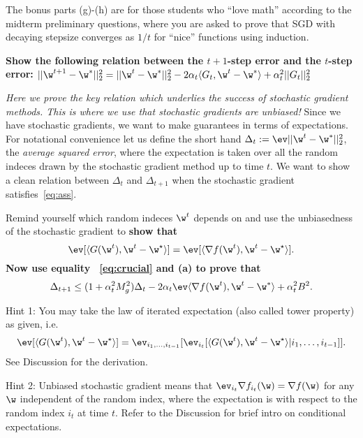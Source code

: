 \documentclass[preview]{standalone}
\begin{document}
The bonus parts (g)-(h) are for those students who ``love math''
according to the midterm preliminary questions, where you are
asked to prove that SGD with decaying stepsize converges as $1/t$
for ``nice'' functions using induction.

\begin{Parts}

\Part \textbf{Show the following relation between the $t+1$-step error and the $t$-step error: $||\w^{t+1} - \w^* ||_2^2 = ||\w^{t} - \w^*||_2^2 - 2\alpha_t \langle G_t, \w^t - \w^* \rangle + \alpha_t^2 ||G_t||_2^2$}



\Part \emph{Here we prove the key relation which underlies the success of stochastic gradient methods. This is where we use that stochastic gradients are unbiased!} Since we have stochastic gradients, we want to make guarantees in terms of expectations. For notational convenience let us define the short hand $\Delta_t := \ev ||\w^t-\w^*||_2^2$, the \emph{average squared error}, where the expectation is taken over all the random indeces drawn by the stochastic gradient method up to time $t$. We want to show a clean relation between $\Delta_t$ and $\Delta_{t+1}$ when the stochastic gradient satisfies~\eqref{eq:ass}. 

Remind yourself which random indeces $\w^t$ depends on and use the
unbiasedness of the stochastic gradient to {\bf show that}
\begin{equation}
\label{eq:crucial}
\ev [ \langle G(\updt{t}), \updt{t} - \best\rangle] = \ev [ \langle \nabla f(\updt{t}),\updt{t}-\best\rangle  ].
\end{equation}
\textbf{Now use equality ~\eqref{eq:crucial} and (a) to prove that}
\begin{equation}
\label{eq:useful}
\Delta_{t+1} \leq (1+\alpha_t^2 M_g^2)\Delta_t - 2\alpha_t \ev \langle \nabla f(\w^t), \w^t - \w^* \rangle + \alpha_t^2 B^2.
\end{equation}

Hint 1: You may take the law of iterated expectation (also called tower property) as given, i.e.
\begin{equation*}
\ev [ \langle G(\updt{t}), \updt{t} - \best\rangle] = \ev_{i_1,\dots,i_{t-1}}[ \ev_{i_t}
[ \langle G(\updt{t}), \updt{t} - \best\rangle | i_1, \dots, i_{t-1}
]].
\end{equation*}
See Discussion for the derivation.

Hint 2: Unbiased stochastic gradient means that $\ev_{i_t} \nabla f_{i_t}(\w) = \nabla f(\w)$ for any $\w$ independent of the random index, where the expectation is with respect to the random index $i_t$ at time $t$. Refer to the Discussion for brief intro on conditional expectations.



\end{Parts}
\end{document}
